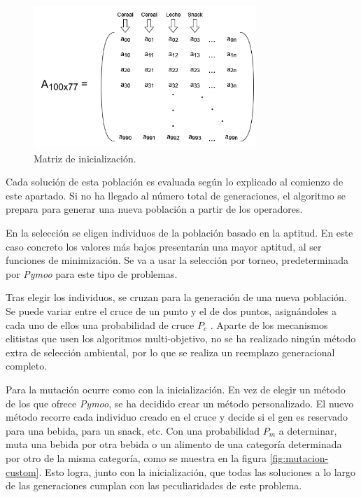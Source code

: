 \begin{figure}[H]
    \centering
    \includegraphics[width=0.75\textwidth]{figures/matriz-inicializacion.png}
    \caption{Matriz de inicialización.}
    \label{fig:matriz-inicializacion}
\end{figure}

Cada solución de esta población es evaluada según lo explicado al comienzo de este apartado. Si no ha llegado al número total de generaciones, el algoritmo se prepara para generar una nueva población a partir de los operadores.

En la selección se eligen individuos de la población basado en la aptitud. En este caso concreto los valores más bajos presentarán una mayor aptitud, al ser funciones de minimización. Se va a usar la selección por torneo, predeterminada por \textit{Pymoo} para este tipo de problemas.

Tras elegir los individuos, se cruzan para la generación de una nueva población.  Se puede variar entre el cruce de un punto y el de dos puntos, asignándoles a cada uno de ellos una probabilidad de cruce \(P_c\)  . Aparte de los mecanismos elitistas que usen los algoritmos multi-objetivo, no se ha realizado ningún método extra de selección ambiental, por lo que se realiza un reemplazo generacional completo.

Para la mutación ocurre como con la inicialización. En vez de elegir un método de los que ofrece \textit{Pymoo}, se ha decidido crear un método personalizado. El nuevo método recorre cada individuo creado en el cruce y decide si el gen es reservado para una bebida, para un snack, etc. Con una probabilidad \(P_m\) a determinar, muta una bebida por otra bebida o un alimento de una categoría determinada por otro de la misma categoría, como se muestra en la figura \ref{fig:mutacion-custom}. Esto logra, junto con la inicialización, que todas las soluciones a lo largo de las generaciones cumplan con las peculiaridades de este problema.


